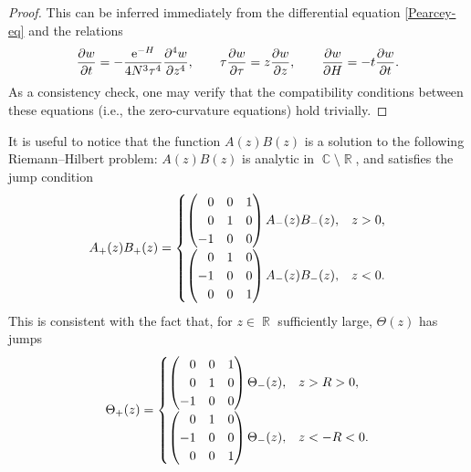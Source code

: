 \documentclass[10pt,a4paper]{amsart}
\DeclareMathOperator{\CC}{\mathbb{C}}
\DeclareMathOperator{\RR}{\mathbb{R}}
\numberwithin{equation}{section}
\begin{document}
\begin{proof}
 This can be inferred immediately from the differential equation \eqref{Pearcey-eq} and the relations
 \begin{equation*}
 \frac{\partial w}{\partial t} = -\frac{{\rm e}^{-H}}{4 N^3\tau^4} \frac{\partial^4 w}{\partial z^4},\qquad \tau\frac{\partial w}{\partial \tau} = z\frac{\partial w}{\partial z},\qquad \frac{\partial w}{\partial H} = -t \frac{\partial w}{\partial t}.
 \end{equation*}
As a consistency check, one may verify that the compatibility conditions between these equations (i.e., the zero-curvature equations) hold trivially.
\end{proof}

\begin{Remark} \label{AB-matrix-remark}
 It is useful to notice that the function $A(z) B(z)$ is a solution to the following Riemann--Hilbert problem:
 $A(z) B(z)$ is analytic in $\CC\setminus\RR$, and satisfies the jump condition
 \begin{equation*}
 A_+(z) B_+(z) =
 \begin{cases}
 \begin{pmatrix}
 \hphantom{-} 0 & 0 & 1\\
 \hphantom{-} 0 & 1 & 0\\
 -1 & 0 & 0\\
 \end{pmatrix}A_-(z) B_-(z), & z > 0, \\[1.5mm]
 \begin{pmatrix}
 \hphantom{-} 0 & 1 & 0\\
 -1 & 0 & 0\\
 \hphantom{-} 0 & 0 & 1\\
 \end{pmatrix}A_-(z) B_-(z), & z < 0.
 \end{cases}
 \end{equation*}
 This is consistent with the fact that, for $z \in \RR$ sufficiently large, $\Theta(z)$ has jumps
 \begin{equation*}
 \Theta_{+}(z) =
 \begin{cases}
 \begin{pmatrix}
 \hphantom{-} 0 & 0 & 1\\
 \hphantom{-} 0 & 1 & 0\\
 -1 & 0 & 0\\
 \end{pmatrix}\Theta_{-}(z), & z > R > 0, \\[1.5mm]
 \begin{pmatrix}
 \hphantom{-} 0 & 1 & 0\\
 -1 & 0 & 0\\
 \hphantom{-} 0 & 0 & 1\\
 \end{pmatrix}\Theta_{-}(z), & z < - R < 0.
 \end{cases}
 \end{equation*}
\end{Remark}
\end{document}
